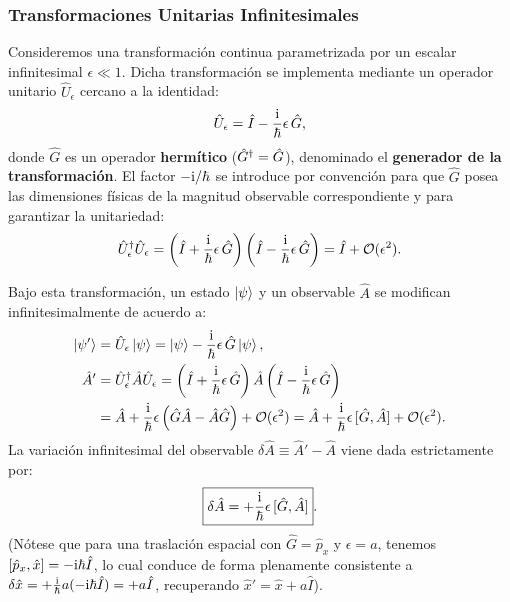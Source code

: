 \subsubsection{Transformaciones Unitarias Infinitesimales}
Consideremos una transformación continua parametrizada por un escalar infinitesimal $\epsilon \ll 1$. Dicha transformación se implementa mediante un operador unitario $\hat{U}_\epsilon$ cercano a la identidad:
\begin{equation}
    \hat{U}_\epsilon = \hat{I} - \frac{\mathrm{i}}{\hbar}\epsilon\,\hat{G},
    \label{eq:infinitesimal_unitary}
\end{equation}
donde $\hat{G}$ es un operador \textbf{hermítico} ($\hat{G}^\dagger = \hat{G}$), denominado el \textbf{generador de la transformación}. El factor $-\mathrm{i}/\hbar$ se introduce por convención para que $\hat{G}$ posea las dimensiones físicas de la magnitud observable correspondiente y para garantizar la unitariedad:
\begin{equation}
    \hat{U}_\epsilon^\dagger \hat{U}_\epsilon = \left(\hat{I} + \frac{\mathrm{i}}{\hbar}\epsilon\,\hat{G}\right)\left(\hat{I} - \frac{\mathrm{i}}{\hbar}\epsilon\,\hat{G}\right) = \hat{I} + \mathcal{O}(\epsilon^2).
\end{equation}

Bajo esta transformación, un estado $\left| \psi \right\rangle$ y un observable $\hat{A}$ se modifican infinitesimalmente de acuerdo a:
\begin{align}
    \left| \psi' \right\rangle &= \hat{U}_\epsilon \left| \psi \right\rangle = \left| \psi \right\rangle - \frac{\mathrm{i}}{\hbar}\epsilon\,\hat{G}\left| \psi \right\rangle, \\
    \hat{A}' &= \hat{U}_\epsilon^\dagger \hat{A} \hat{U}_\epsilon = \left(\hat{I} + \frac{\mathrm{i}}{\hbar}\epsilon\,\hat{G}\right)\hat{A}\left(\hat{I} - \frac{\mathrm{i}}{\hbar}\epsilon\,\hat{G}\right) \nonumber\\
    &= \hat{A} + \frac{\mathrm{i}}{\hbar}\epsilon\left(\hat{G}\hat{A} - \hat{A}\hat{G}\right) + \mathcal{O}(\epsilon^2) = \hat{A} + \frac{\mathrm{i}}{\hbar}\epsilon\,[\hat{G}, \hat{A}] + \mathcal{O}(\epsilon^2).
\end{align}
La variación infinitesimal del observable $\delta\hat{A} \equiv \hat{A}' - \hat{A}$ viene dada estrictamente por:
\begin{equation}
    \boxed{\delta\hat{A} = +\frac{\mathrm{i}}{\hbar}\epsilon\,[\hat{G}, \hat{A}]}.
    \label{eq:infinitesimal_variation}
\end{equation}
(Nótese que para una traslación espacial con $\hat{G} = \hat{p}_x$ y $\epsilon = a$, tenemos $[\hat{p}_x, \hat{x}] = -\mathrm{i}\hbar\hat{I}$, lo cual conduce de forma plenamente consistente a $\delta\hat{x} = +\frac{\mathrm{i}}{\hbar}a(-\mathrm{i}\hbar\hat{I}) = +a\hat{I}$, recuperando $\hat{x}' = \hat{x} + a\hat{I}$).


